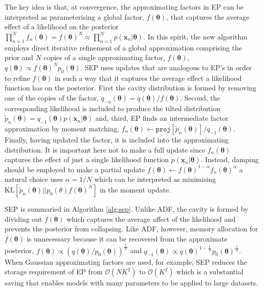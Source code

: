 The key idea is that, at convergence, the approximating factors in EP can be interpreted as parameterising a global factor,  $f(\bm{\theta})$, that captures the average effect of a likelihood on the posterior  $\prod_{n=1}^{N} f_n(\bm{\theta}) = f(\bm{\theta})^{N} \approx \prod_{n=1}^{N} p(\bm{x}_n | \bm{\theta})$. In this spirit, the new algorithm employs direct iterative refinement of a global approximation comprising the prior and $N$ copies of a single approximating factor, $f(\bm{\theta})$, $q(\bm{\theta}) \propto f(\bm{\theta})^N p_0(\bm{\theta})$.
%
%
SEP uses updates that are analogous to EP's in order to refine $f(\bm{\theta})$ in such a way that it captures the average effect a likelihood function has on the posterior. First the cavity distribution is formed by removing one of the copies of the factor, $q_{-n}(\bm{\theta}) =q(\bm{\theta})/f(\bm{\theta})$. 
Second, the corresponding likelihood is included to produce the tilted distribution $\tilde{p}_n(\bm{\theta}) = q_{-1}(\bm{\theta}) p(\bm{x}_n | \bm{\theta})$ and, third, EP finds an intermediate factor approximation by moment matching, $f_n(\bm{\theta}) \leftarrow \mathtt{proj}[\tilde{p}_n(\bm{\theta})] / q_{-1}(\bm{\theta}) $. Finally, having updated the factor, it is included into the approximating distribution. It is important here not to make a full update since $f_n(\bm{\theta})$ captures the effect of just a single likelihood function  $p(\bm{x}_n | \bm{\theta})$. Instead, damping should be employed to make a partial update $f(\bm{\theta}) \leftarrow f(\bm{\theta})^{1 - \alpha} f_n(\bm{\theta})^{\alpha}$ a natural choice uses $\alpha = 1/N$ which can be interpreted as minimising  $\mathrm{KL}[\tilde{p}_n(\bm{\theta}) || p_{0}(\theta)  f(\bm{\theta})^N]$ in the moment update.

SEP is summaried in Algorithm \ref{alg:sep}. Unlike ADF, the cavity is formed by dividing out $f(\bm{\theta})$ which captures the average affect of the likelihood and prevents the posterior from collapsing. Like ADF, however, memory allocation for $f(\bm{\theta})$ is unnecessary because it can be recovered from the approximate posterior, $f(\bm{\theta}) \propto (q(\bm{\theta}) / p_0(\bm{\theta}))^{\frac{1}{N}}$ and $q_{-1}(\bm{\theta}) \propto q(\bm{\theta})^{1 - \frac{1}{N}} p_0(\bm{\theta})^{\frac{1}{N}}$. When Gaussian approximating factors are used, for example, SEP reduces the storage requirement of EP from  $\mathcal{O}(NK^2)$ to $\mathcal{O}(K^2)$ which is a substantial saving that enables models with many parameters to be applied to large datasets. 

